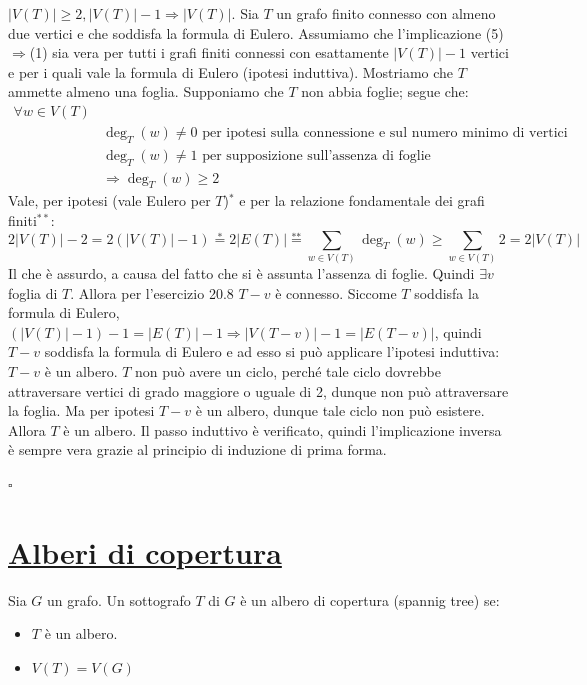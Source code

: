 \documentclass[oneside]{book}
\theoremstyle{remark}
\newcommand{\teorema}[1]{\section{\underline{#1}}}
\newcommand{\cvd}{\begin{flushright}$\square$\end{flushright}} %
\begin{document}
\begin{tcolorbox}[title={Teorema di caratterizzazione degli alberi finiti mediante la formula di Eulero}]
    $|V(T)|\geq 2, |V(T)|-1\Longrightarrow|V(T)|$. Sia $T$ un grafo finito
    connesso con almeno due vertici e che soddisfa la formula di Eulero. Assumiamo che l'implicazione
    (5)$\Rightarrow$(1) sia vera per tutti i grafi finiti connessi con esattamente
    $|V(T)|-1$ vertici e per i quali vale la formula di Eulero (ipotesi induttiva).
    Mostriamo che $T$ ammette almeno una foglia.
    Supponiamo che $T$ non abbia foglie; segue che:
    \begin{align*}
        \forall w\in V(T) &\\
        &\deg_T(w)\not = 0 \text{ per ipotesi sulla connessione e sul numero minimo di vertici}\\
        &\deg_T(w)\not = 1 \text{ per supposizione sull'assenza di foglie}\\
        &\Longrightarrow \deg_T(w)\geq 2
    \end{align*}
    Vale, per ipotesi (vale Eulero per $T$)$^*$ e per la relazione fondamentale dei grafi finiti$^{**}$:
    \[ 2|V(T)|-2 = 2(|V(T)|-1)\stackrel{\text{*}}{=}2|E(T)|\stackrel{\text{**}}{=}\sum_{w\in V(T)}\deg_T(w)\geq \sum_{w\in V(T)}2=2|V(T)| \]
    Il che è assurdo, a causa del fatto che si è assunta l'assenza di foglie.
    Quindi $\exists v$ foglia di $T$. Allora per l'esercizio 20.8 $T-v$ è connesso.
    Siccome $T$ soddisfa la formula di Eulero, $(|V(T)|-1) -1 = |E(T)|-1
    \Rightarrow |V(T-v)|-1=|E(T-v)|$, quindi $T-v$ soddisfa la formula di Eulero
    e ad esso si può applicare l'ipotesi induttiva: $T-v$ è un albero. $T$ non
    può avere un ciclo, perché tale ciclo dovrebbe attraversare vertici di grado
    maggiore o uguale di 2, dunque non può attraversare la foglia. Ma per ipotesi
    $T-v$ è un albero, dunque tale ciclo non può esistere. Allora $T$ è un albero.
    Il passo induttivo è verificato, quindi l'implicazione inversa è sempre vera
    grazie al principio di induzione di prima forma.
    \cvd
\end{tcolorbox}


\teorema{Alberi di copertura}
\begin{tcolorbox}[colback=yellow!30, colframe=yellow!30!black, title=Albero di copertura]
Sia $G$ un grafo. Un sottografo $T$ di $G$ è un albero di copertura (spannig tree) se:
\begin{itemize}
    \item $T$ è un albero.
    \item $V(T)=V(G)$
\end{itemize}
\end{tcolorbox}
\end{document}
